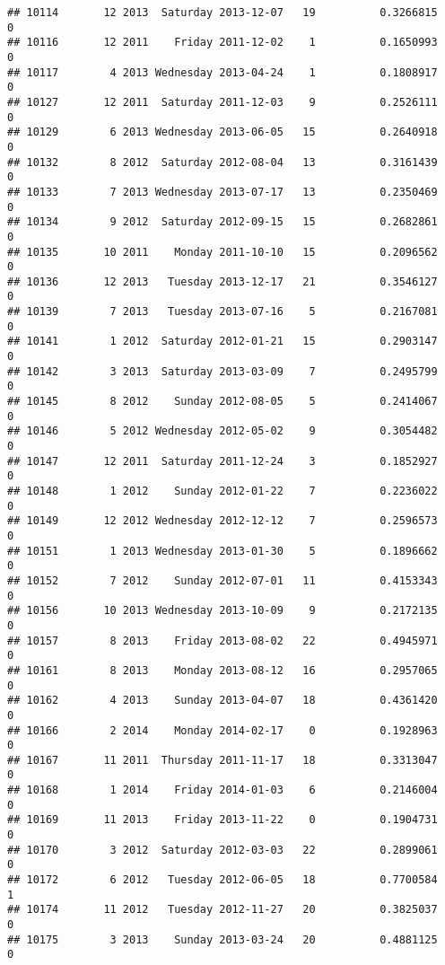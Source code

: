 \documentclass[
]{article}
\begin{document}
\begin{verbatim}
## 10114       12 2013  Saturday 2013-12-07   19          0.3266815             0
## 10116       12 2011    Friday 2011-12-02    1          0.1650993             0
## 10117        4 2013 Wednesday 2013-04-24    1          0.1808917             0
## 10127       12 2011  Saturday 2011-12-03    9          0.2526111             0
## 10129        6 2013 Wednesday 2013-06-05   15          0.2640918             0
## 10132        8 2012  Saturday 2012-08-04   13          0.3161439             0
## 10133        7 2013 Wednesday 2013-07-17   13          0.2350469             0
## 10134        9 2012  Saturday 2012-09-15   15          0.2682861             0
## 10135       10 2011    Monday 2011-10-10   15          0.2096562             0
## 10136       12 2013   Tuesday 2013-12-17   21          0.3546127             0
## 10139        7 2013   Tuesday 2013-07-16    5          0.2167081             0
## 10141        1 2012  Saturday 2012-01-21   15          0.2903147             0
## 10142        3 2013  Saturday 2013-03-09    7          0.2495799             0
## 10145        8 2012    Sunday 2012-08-05    5          0.2414067             0
## 10146        5 2012 Wednesday 2012-05-02    9          0.3054482             0
## 10147       12 2011  Saturday 2011-12-24    3          0.1852927             0
## 10148        1 2012    Sunday 2012-01-22    7          0.2236022             0
## 10149       12 2012 Wednesday 2012-12-12    7          0.2596573             0
## 10151        1 2013 Wednesday 2013-01-30    5          0.1896662             0
## 10152        7 2012    Sunday 2012-07-01   11          0.4153343             0
## 10156       10 2013 Wednesday 2013-10-09    9          0.2172135             0
## 10157        8 2013    Friday 2013-08-02   22          0.4945971             0
## 10161        8 2013    Monday 2013-08-12   16          0.2957065             0
## 10162        4 2013    Sunday 2013-04-07   18          0.4361420             0
## 10166        2 2014    Monday 2014-02-17    0          0.1928963             0
## 10167       11 2011  Thursday 2011-11-17   18          0.3313047             0
## 10168        1 2014    Friday 2014-01-03    6          0.2146004             0
## 10169       11 2013    Friday 2013-11-22    0          0.1904731             0
## 10170        3 2012  Saturday 2012-03-03   22          0.2899061             0
## 10172        6 2012   Tuesday 2012-06-05   18          0.7700584             1
## 10174       11 2012   Tuesday 2012-11-27   20          0.3825037             0
## 10175        3 2013    Sunday 2013-03-24   20          0.4881125             0

\end{verbatim}
\end{document}
